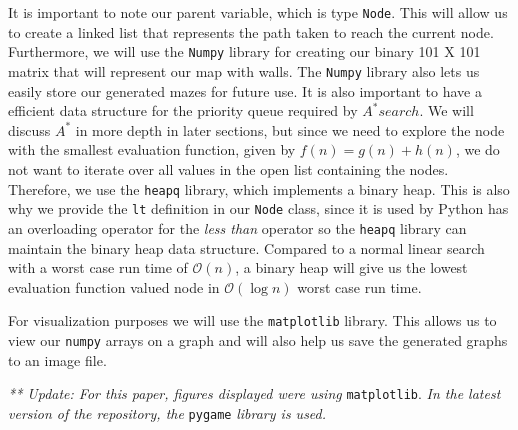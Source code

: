 It is important to note our parent variable, which is type \texttt{Node}. This will allow us to create a linked list that represents the path taken to reach the current node. Furthermore, we will use the \texttt{Numpy} library for creating our binary 101 X 101 matrix that will represent our map with walls. The \texttt{Numpy} library also lets us easily store our generated mazes for future use. It is also important to have a efficient data structure for the priority queue required by $A^* search$. We will discuss $A^*$ in more depth in later sections, but since we need to explore the node with the smallest evaluation function, given by $f(n) = g(n) + h(n)$, we do not want to iterate over all values in the open list containing the nodes. Therefore, we use the \texttt{heapq} library, which implements a binary heap. This is also why we provide the \texttt{lt} definition in our \texttt{Node} class, since it is used by Python has an overloading operator for the \emph{less than} operator so the \texttt{heapq} library can maintain the binary heap data structure. Compared to a normal linear search with a worst case run time of $\mathcal{O}(n)$, a binary heap will give us the lowest evaluation function valued node in $\mathcal{O}(\log n)$ worst case run time.

For visualization purposes we will use the \texttt{matplotlib} library. This allows us to view our \texttt{numpy} arrays on a graph and will also help us save the generated graphs to an image file.



\emph{** Update: For this paper, figures displayed were using }\texttt{matplotlib}. \emph{In the latest version of the repository, the} \texttt{pygame} \emph{library is used.}